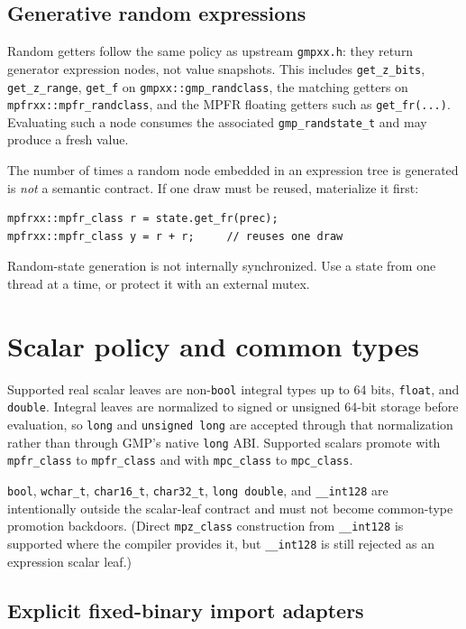 \documentclass[11pt,a4paper]{article}
\newcommand{\code}[1]{\lstinline!#1!}
\begin{document}
\subsection{Generative random expressions}

Random getters follow the same policy as upstream \code{gmpxx.h}: they return
generator expression nodes, not value snapshots. This includes
\code{get_z_bits}, \code{get_z_range}, \code{get_f} on \code{gmpxx::gmp_randclass},
the matching getters on \code{mpfrxx::mpfr_randclass}, and the MPFR floating
getters such as \code{get_fr(...)}. Evaluating such a node consumes the
associated \code{gmp_randstate_t} and may produce a fresh value.

The number of times a random node embedded in an expression tree is generated is
\emph{not} a semantic contract. If one draw must be reused, materialize it first:

\begin{lstlisting}
mpfrxx::mpfr_class r = state.get_fr(prec);
mpfrxx::mpfr_class y = r + r;     // reuses one draw
\end{lstlisting}

Random-state generation is not internally synchronized. Use a state from
one thread at a time, or protect it with an external mutex.

\section{Scalar policy and common types}

Supported real scalar leaves are non-\code{bool} integral types up to 64 bits,
\code{float}, and \code{double}. Integral leaves are normalized to signed or
unsigned 64-bit storage before evaluation, so \code{long} and
\code{unsigned long} are accepted through that normalization rather than through
GMP's native \code{long} ABI. Supported scalars promote with \code{mpfr_class} to
\code{mpfr_class} and with \code{mpc_class} to \code{mpc_class}.

\code{bool}, \code{wchar_t}, \code{char16_t}, \code{char32_t}, \code{long double},
and \code{__int128} are intentionally outside the scalar-leaf contract and must
not become common-type promotion backdoors. (Direct \code{mpz_class}
construction from \code{__int128} is supported where the compiler provides it,
but \code{__int128} is still rejected as an expression scalar leaf.)

\subsection{Explicit fixed-binary import adapters}
\end{document}
